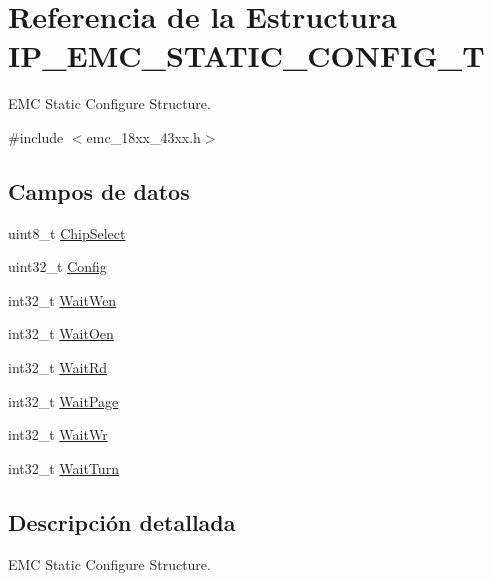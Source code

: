 \hypertarget{struct_i_p___e_m_c___s_t_a_t_i_c___c_o_n_f_i_g___t}{}\section{Referencia de la Estructura I\+P\+\_\+\+E\+M\+C\+\_\+\+S\+T\+A\+T\+I\+C\+\_\+\+C\+O\+N\+F\+I\+G\+\_\+T}
\label{struct_i_p___e_m_c___s_t_a_t_i_c___c_o_n_f_i_g___t}


E\+MC Static Configure Structure.  




{\ttfamily \#include $<$emc\+\_\+18xx\+\_\+43xx.\+h$>$}

\subsection*{Campos de datos}
\begin{DoxyCompactItemize}
\item 
uint8\+\_\+t \hyperlink{struct_i_p___e_m_c___s_t_a_t_i_c___c_o_n_f_i_g___t_a7b96dc4f20106357e9710005448538b4}{Chip\+Select}
\item 
uint32\+\_\+t \hyperlink{struct_i_p___e_m_c___s_t_a_t_i_c___c_o_n_f_i_g___t_a4ce7377178b8c0ee57726e8a73c06e66}{Config}
\item 
int32\+\_\+t \hyperlink{struct_i_p___e_m_c___s_t_a_t_i_c___c_o_n_f_i_g___t_ad785fff7b2fa061c10fd68dfbe965ef2}{Wait\+Wen}
\item 
int32\+\_\+t \hyperlink{struct_i_p___e_m_c___s_t_a_t_i_c___c_o_n_f_i_g___t_ae9934f7f1acc736bc00c41c062f5492b}{Wait\+Oen}
\item 
int32\+\_\+t \hyperlink{struct_i_p___e_m_c___s_t_a_t_i_c___c_o_n_f_i_g___t_a0a4abf1deb6b835a1a3f41430f928b0c}{Wait\+Rd}
\item 
int32\+\_\+t \hyperlink{struct_i_p___e_m_c___s_t_a_t_i_c___c_o_n_f_i_g___t_a821b29d36890644c704731582b54c541}{Wait\+Page}
\item 
int32\+\_\+t \hyperlink{struct_i_p___e_m_c___s_t_a_t_i_c___c_o_n_f_i_g___t_adb3edc7aa6d809b98760eb42e6afcd89}{Wait\+Wr}
\item 
int32\+\_\+t \hyperlink{struct_i_p___e_m_c___s_t_a_t_i_c___c_o_n_f_i_g___t_a56dcec9bd2a8a86669271468dc424f97}{Wait\+Turn}
\end{DoxyCompactItemize}


\subsection{Descripción detallada}
E\+MC Static Configure Structure. 

